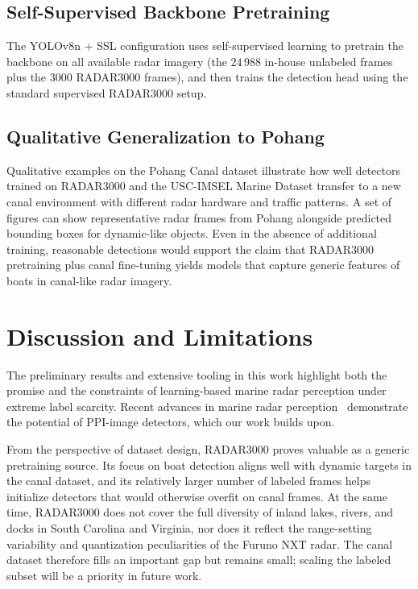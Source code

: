 \documentclass[conference]{IEEEtran}
\begin{document}
\subsection{Self-Supervised Backbone Pretraining}
The YOLOv8n + SSL configuration uses self-supervised learning to pretrain the backbone on all available radar imagery (the $24\,988$ in-house unlabeled frames plus the $3000$ RADAR3000 frames), and then trains the detection head using the standard supervised RADAR3000 setup.

\subsection{Qualitative Generalization to Pohang}
Qualitative examples on the Pohang Canal dataset illustrate how well detectors trained on RADAR3000 and the USC-IMSEL Marine Dataset transfer to a new canal environment with different radar hardware and traffic patterns. A set of figures can show representative radar frames from Pohang alongside predicted bounding boxes for dynamic-like objects. Even in the absence of additional training, reasonable detections would support the claim that RADAR3000 pretraining plus canal fine-tuning yields models that capture generic features of boats in canal-like radar imagery.

\section{Discussion and Limitations}
\label{sec:discussion}
The preliminary results and extensive tooling in this work highlight both the promise and the constraints of learning-based marine radar perception under extreme label scarcity. Recent advances in marine radar perception~\cite{zhang2023yolo_swformer, chen2021radar_ppinet} demonstrate the potential of PPI-image detectors, which our work builds upon.

From the perspective of dataset design, RADAR3000 proves valuable as a generic pretraining source. Its focus on boat detection aligns well with dynamic targets in the canal dataset, and its relatively larger number of labeled frames helps initialize detectors that would otherwise overfit on canal frames. At the same time, RADAR3000 does not cover the full diversity of inland lakes, rivers, and docks in South Carolina and Virginia, nor does it reflect the range-setting variability and quantization peculiarities of the Furuno NXT radar. The canal dataset therefore fills an important gap but remains small; scaling the labeled subset will be a priority in future work.
\end{document}
